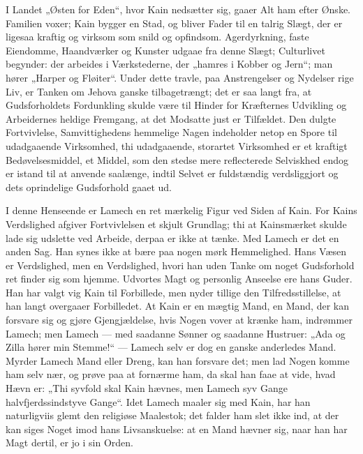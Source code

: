 \documentclass[12pt]{book}
\begin{document}
I Landet „Østen for Eden“, hvor Kain nedsætter sig, gaaer Alt ham
efter Ønske. Familien voxer; Kain bygger en Stad, og bliver Fader
til en talrig Slægt, der er ligesaa kraftig og virksom som snild og
opfindsom. Agerdyrkning, faste Eiendomme, Haandværker og Kunster
udgaae fra denne Slægt; Culturlivet begynder: der arbeides i
Værkstederne, der „hamres i Kobber og Jern“; man hører „Harper og
Fløiter“. Under dette travle, paa Anstrengelser og Nydelser rige
Liv, er Tanken om Jehova ganske tilbagetrængt; det er saa langt fra,
at Gudsforholdets Fordunkling skulde være til Hinder for Kræfternes
Udvikling og Arbeidernes heldige Fremgang, at det Modsatte just er
Tilfældet. Den dulgte Fortvivlelse, Samvittighedens hemmelige Nagen
indeholder netop en Spore til udadgaaende Virksomhed, thi
udadgaaende, storartet Virksomhed er et kraftigt Bedøvelsesmiddel,
et Middel, som den stedse mere reflecterede Selviskhed endog er
istand til at anvende saalænge, indtil Selvet er fuldstændig
verdsliggjort og dets oprindelige Gudsforhold gaaet ud.

I denne Henseende er Lamech en ret mærkelig Figur ved Siden af Kain.
For Kains Verdslighed afgiver Fortvivlelsen et skjult Grundlag; thi
at Kainsmærket skulde lade sig udslette ved Arbeide, derpaa er ikke
at tænke.
Med Lamech er det en anden Sag. Han synes ikke at bære paa nogen
mørk Hemmelighed. Hans Væsen er Verdslighed, men en Verdslighed,
hvori han uden Tanke om noget Gudsforhold ret finder sig som hjemme.
Udvortes Magt og personlig Anseelse ere hans Guder. Han
har valgt vig Kain til Forbillede, men nyder tillige den
Tilfredsstillelse, at han langt overgaaer Forbilledet. At Kain er en
mægtig Mand, en Mand, der kan forsvare sig og gjøre Gjengjældelse,
hvis Nogen vover at krænke ham, indrømmer Lamech; men Lamech ---
med saadanne Sønner og saadanne Hustruer: „Ada og Zilla hører min
Stemme!“ --- Lamech selv er dog en ganske anderledes Mand. Myrder
Lamech Mand eller Dreng, kan han forsvare det; men lad Nogen komme
ham selv nær, og prøve paa at fornærme ham, da skal han faae at
vide, hvad Hævn er: „Thi syvfold skal Kain hævnes, men Lamech syv
Gange halvfjerdssindstyve Gange“. Idet Lamech maaler sig med Kain,
har han naturligviis glemt den religiøse Maalestok; det falder ham
slet ikke ind, at der kan siges Noget imod hans Livsanskuelse: at en
Mand hævner sig, naar han har Magt dertil, er jo i sin Orden.
\end{document}
